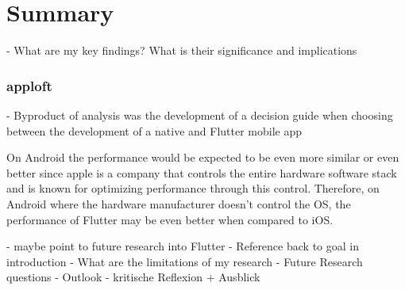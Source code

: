 \chapter{Summary}
- What are my key findings? What is their significance and implications

\subsection{apploft}
- Byproduct of analysis was the development of a decision guide when choosing
between the development of a native and Flutter mobile app

On Android the performance would be expected to be even more similar or even better since apple is a company that controls the entire hardware software stack and is known for optimizing performance through this control.
Therefore, on Android where the hardware manufacturer doesn't control the OS, the performance of Flutter may be even better when compared to iOS.

- maybe point to future research into Flutter
- Reference back to goal in introduction
- What are the limitations of my research
- Future Research questions
- Outlook
- kritische Reflexion + Ausblick

